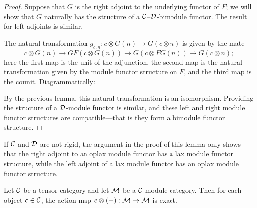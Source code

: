 \documentclass{amsart}
\begin{document}
\begin{proof}
Suppose that $G$ is the right adjoint to the underlying functor of $F$; we will show that $G$ naturally has the structure of a $\mathcal C$--$\mathcal D$-bimodule functor.  The result for left adjoints is similar.

The natural transformation $g_{c,n}: c \otimes G(n) \rightarrow G(c \otimes n)$ is given by the mate
$$c \otimes G(n) \rightarrow G F(c \otimes G(n)) \rightarrow G(c \otimes FG(n)) \rightarrow G(c \otimes n);$$
here the first map is the unit of the adjunction, the second map is the natural transformation given by the module functor structure on $F$, and the third map is the counit.  Diagrammatically: 
\begin{center}
\end{center}

\noindent By the previous lemma, this natural transformation is an isomorphism.  Providing the structure of a $\mathcal D$-module functor is similar, and these left and right module functor structures are compatible---that is they form a bimodule functor structure.
\end{proof}

\begin{remark}
If $\mathcal C$ and $\mathcal D$ are not rigid, the argument in the proof of this lemma only shows that the right adjoint to an oplax module functor has a lax module functor structure, while the left adjoint of a lax module functor has an oplax module functor structure.  %
\end{remark}

\begin{lemma}\label{lem:partially_exact_action} \cite[Prop. 1.13.1]{EGNO} \cite[Prop. 2.1.8]{MR1797619}
	Let $\mathcal C$ be a tensor category and let $\mathcal M$ be a $\mathcal C$-module category. Then for each object $c \in \mathcal C$, the action map $c \otimes (-): \mathcal M \to \mathcal M$ is exact. 
\end{lemma}
\end{document}
